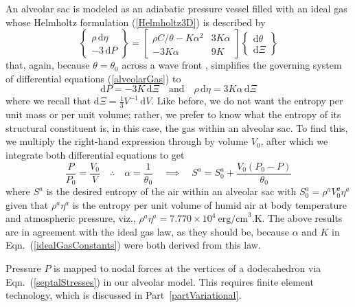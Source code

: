 An alveolar sac is modeled as an adiabatic pressure vessel filled with an ideal gas whose Helmholtz formulation (\ref{Helmholtz3D}) is described by
\begin{equation}
\left\{ \begin{matrix}
\rho \, \mathrm{d} \eta \\ -3 \, \mathrm{d} P
\end{matrix} \right\} = \begin{bmatrix}
\rho C / \theta - K \alpha^2 & 3 K \alpha \\ 
-3K\alpha & 9K
\end{bmatrix} \left\{ \begin{matrix}
\mathrm{d} \theta \\ \mathrm{d} \Xi
\end{matrix} \right\}
\label{alveolarGas}
\end{equation}
that, again, because $\theta = \theta_0$ across a wave front \cite{AmesStaff53}, simplifies the governing system of differential equations (\ref{alveolarGas}) to
\begin{displaymath}
    \mathrm{d}P = -3K \, \mathrm{d} \Xi 
    \quad \text{and} \quad
    \rho \, \mathrm{d} \eta = 3 K \alpha \, \mathrm{d} \Xi
\end{displaymath}
where we recall that $\mathrm{d}\Xi = \tfrac{1}{3} V^{-1} \, \mathrm{d} V$.  Like before, we do not want the entropy per unit mass or per unit volume; rather, we prefer to know what the entropy of its structural constituent is, in this case, the gas within an alveolar sac.  To find this, we multiply the right-hand expression through by volume $V_0$, after which we integrate both differential equations to get
\begin{equation}
    \frac{P}{P_0} = \frac{V_0}{V}
    \quad \therefore \quad
    \alpha = \frac{1}{\theta_0}
    \quad \implies \quad
    S^a = S^a_0 + \frac{V_0 ( P_0 - P )}{\theta_0}
    \label{alveolarSacCE}
\end{equation}
where $S^a$ is the desired entropy of the air within an alveolar sac with $S^a_0 = \rho^a V^a_0 \eta^a$ given that $\rho^a \eta^a$ is the entropy per unit volume of humid air at body temperature and atmospheric pressure, viz., $\rho^a \eta^a = 7.770 \times 10^4 \: \text{erg/cm}^3\text{.K}$.  The above results are in agreement with the ideal gas law, as they should be, because $\alpha$ and $K$ in Eqn.~(\ref{idealGasConstants}) were both derived from this law.

Pressure $P$ is mapped to nodal forces at the vertices of a dodecahedron via Eqn.~(\ref{septalStresses}) in our alveolar model.  This requires finite element technology, which is discussed in Part~\ref{partVariational}.

